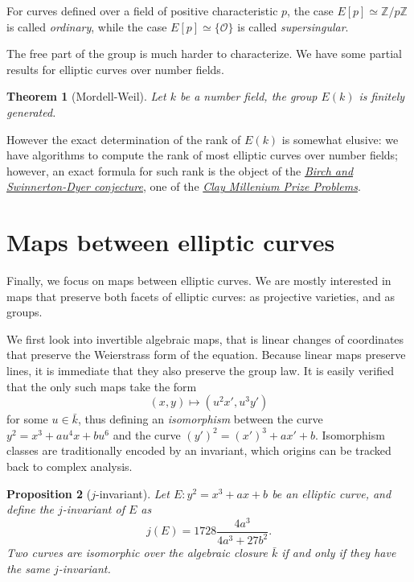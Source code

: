 \documentclass[10pt]{article}
\theoremstyle{plain}
\newtheorem{theorem}{Theorem}
\newtheorem{proposition}[theorem]{Proposition}
\theoremstyle{definition}
\def\O{\ensuremath{\mathcal{O}}}
\begin{document}
For curves defined over a field of positive characteristic $p$, the
case $E[p]≃ℤ/pℤ$ is called \emph{ordinary}, while the case
$E[p]≃\{\O\}$ is called \emph{supersingular}.

The free part of the group is much harder to characterize. %
We have some partial results for elliptic curves over number fields.

\begin{theorem}[Mordell-Weil]
  Let $k$ be a number field, the group $E(k)$ is finitely generated.
\end{theorem}

However the exact determination of the rank of $E(k)$ is somewhat
elusive: we have algorithms to compute the rank of most elliptic
curves over number fields; however, an exact formula for such rank is
the object of the
\href{https://en.wikipedia.org/wiki/Birch_and_Swinnerton-Dyer_conjecture}{\it
  Birch and Swinnerton-Dyer conjecture}, one of the
\href{https://en.wikipedia.org/wiki/Millennium_Prize_Problems}{\it
  Clay Millenium Prize Problems}.

\section{Maps between elliptic curves}

Finally, we focus on maps between elliptic curves. %
We are mostly interested in maps that preserve both facets of elliptic
curves: as projective varieties, and as groups. %

We first look into invertible algebraic maps, that is linear changes
of coordinates that preserve the Weierstrass form of the equation. %
Because linear maps preserve lines, it is immediate that they also
preserve the group law. %
It is easily verified that the only such maps take the form
\[(x,y) \mapsto (u^2x', u^3y')\] %
for some $u∈\bar{k}$, thus defining an \emph{isomorphism} between the
curve $y^2=x^3+au^4x+bu^6$ and the curve $(y')^2 = (x')^3 + ax' +
b$. %
Isomorphism classes are traditionally encoded by an invariant, which
origins can be tracked back to complex analysis.

\begin{proposition}[$j$-invariant]
  \label{th:j}
  Let $E:y^2=x^3+ax+b$ be an elliptic curve, and define the
  \emph{$j$-invariant} of $E$ as
  \[j(E) = 1728\frac{4a^3}{4a^3+27b^2}.\] %
  Two curves are isomorphic over the algebraic closure $\bar{k}$ if
  and only if they have the same $j$-invariant.
\end{proposition}
\end{document}

